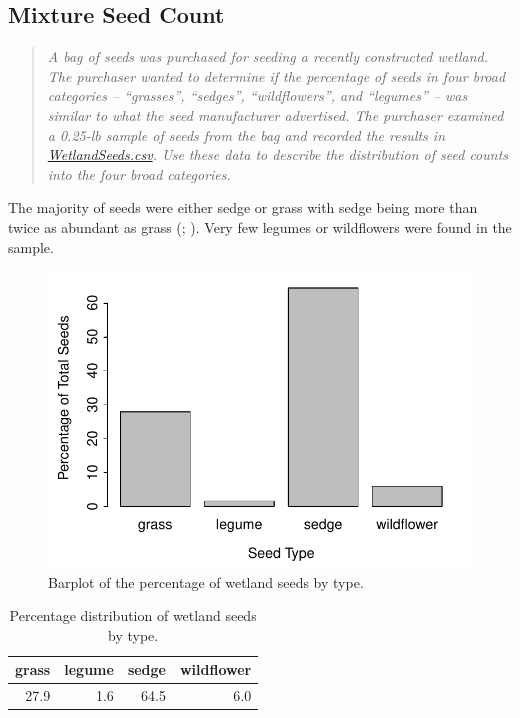 \documentclass[10pt,openany]{book}\usepackage[]{graphicx}\usepackage[]{color}
\newenvironment{knitrout}{}{} %
\begin{document}
\subsection{Mixture Seed Count}
\begin{quote}
\textit{A bag of seeds was purchased for seeding a recently constructed wetland. The purchaser wanted to determine if the percentage of seeds in four broad categories -- ``grasses'', ``sedges'', ``wildflowers'', and ``legumes'' -- was similar to what the seed manufacturer advertised. The purchaser examined a 0.25-lb sample of seeds from the bag and recorded the results in \href{https://raw.githubusercontent.com/droglenc/NCData/master/WetlandSeeds.csv}{WetlandSeeds.csv}. Use these data to describe the distribution of seed counts into the four broad categories.}
\end{quote}



The majority of seeds were either sedge or grass with sedge being more than twice as abundant as grass (; ). Very few legumes or wildflowers were found in the sample.

\begin{knitrout}
\color{fgcolor}\begin{figure}[hbtp]

{\centering \includegraphics[width=.5\linewidth]{Figs/SeedBarplot-1} 

}

\caption[Barplot of the percentage of wetland seeds by type]{Barplot of the percentage of wetland seeds by type.}\label{fig:SeedBarplot}
\end{figure}


\end{knitrout}

\begin{table}[ht]
\centering
\caption{Percentage distribution of wetland seeds by type.} 
\label{tab:SeedTable}
\begin{tabular}{rrrr}
  \hline
grass & legume & sedge & wildflower \\ 
  \hline
27.9 & 1.6 & 64.5 & 6.0 \\ 
   \hline
\end{tabular}
\end{table}
\end{document}

